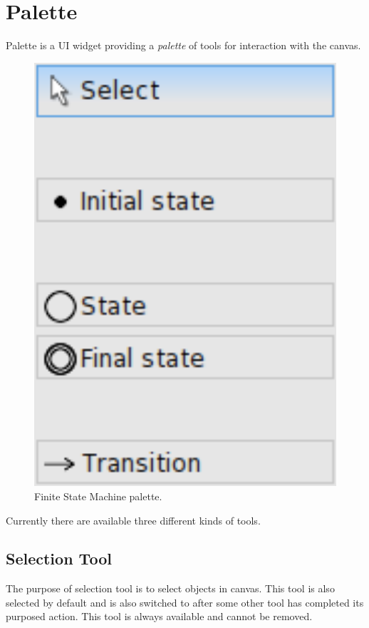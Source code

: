 \documentclass[a4paper,10pt,twoside]{book}
\begin{document}
\fi
\sloppy

\chapter{ Palette}
Palette is a UI widget providing a \textit{palette} of tools for interaction with the canvas.


\begin{figure}

\begin{center}
\includegraphics[width=1.0\textwidth]{../figures/palette-example.png}\caption{Finite State Machine palette.\label{../figures/palette-example.png}}\end{center}
\end{figure}


Currently there are available three different kinds of tools.
\section{ Selection Tool}
The purpose of selection tool is to select objects in canvas. This tool is also selected by default and is also switched to after some other tool has completed its purposed action.
This tool is always available and cannot be removed.
\end{document}
